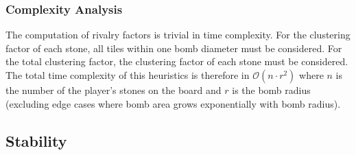 \documentclass[a4paper,12pt]{article}
\begin{document}
    \subsubsection{Complexity Analysis}
    The computation of rivalry factors is trivial in time complexity. For the clustering factor of each stone, all tiles within one bomb diameter must be considered. For the total clustering factor, the clustering factor of each stone must be considered. The total time complexity of this heuristics is therefore in $\mathcal{O}(n \cdot r^2)$ where $n$ is the number of the player's stones on the board and $r$ is the bomb radius (excluding edge cases where bomb area grows exponentially with bomb radius).       
    \subsection{Stability}
\end{document}
